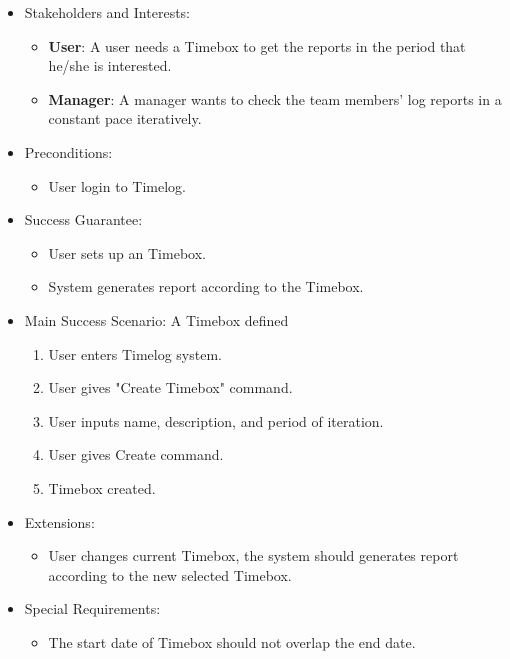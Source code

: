 \documentclass[12pt, a4paper]{article}
\begin{document}
\begin{CJK*}{UTF8}{bkai}
\begin{enumerate}
\begin{itemize}
          \item Stakeholders and Interests:
            \begin{itemize}
              \item {\bf User}: A user needs a Timebox to get the reports in the period that he/she is interested.
              \item {\bf Manager}: A manager wants to check the team members' log reports in a constant pace iteratively.
            \end{itemize}
          \item Preconditions:
            \begin{itemize}
              \item User login to Timelog.
            \end{itemize}
          \item Success Guarantee:
            \begin{itemize}
              \item User sets up an Timebox.
              \item System generates report according to the Timebox.
            \end{itemize}
          \item Main Success Scenario: A Timebox defined
            \begin{enumerate}
              \item User enters Timelog system.
              \item User gives "Create Timebox" command.
              \item User inputs name, description, and period of iteration.
              \item User gives Create command.
              \item Timebox created.
            \end{enumerate}
          \item Extensions:
            \begin{itemize}
              \item User changes current Timebox, the system should generates report according to the new selected Timebox.
            \end{itemize}
          \item Special Requirements:
            \begin{itemize}
              \item The start date of Timebox should not overlap the end date.
            \end{itemize}

\end{itemize}
\end{enumerate}
\end{CJK*}
\end{document}
